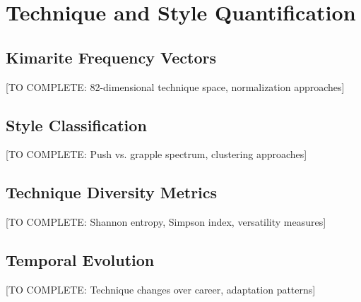 \section{Technique and Style Quantification}

\subsection{Kimarite Frequency Vectors}

[TO COMPLETE: 82-dimensional technique space, normalization approaches]

\subsection{Style Classification}

[TO COMPLETE: Push vs. grapple spectrum, clustering approaches]

\subsection{Technique Diversity Metrics}

[TO COMPLETE: Shannon entropy, Simpson index, versatility measures]

\subsection{Temporal Evolution}

[TO COMPLETE: Technique changes over career, adaptation patterns]